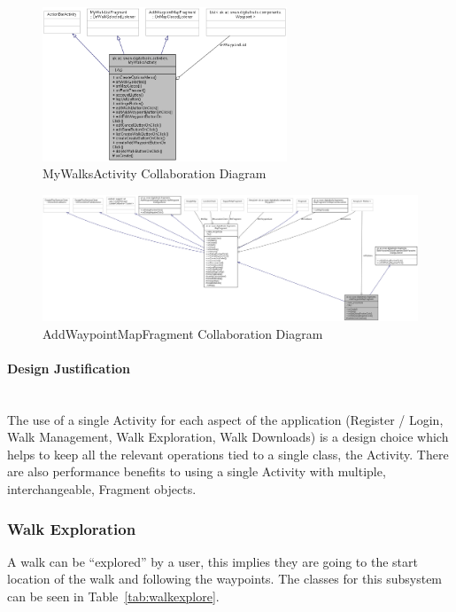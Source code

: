 \documentclass[11pt,a4paper]{report}
\begin{document}
\begin{figure}[H]
    \centering
    \includegraphics[width=0.65\textwidth]{mywalksactcollab}
    \caption{MyWalksActivity Collaboration Diagram}
    \label{fig:mywalksactcollab}
\end{figure}

\begin{figure}[H]
    \centering
    \includegraphics[width=.96\textheight, angle=90]{addwaypointcollab}
    \caption{AddWaypointMapFragment Collaboration Diagram}
    \label{fig:addwaypointcollab}
\end{figure}


\paragraph*{Design Justification}\mbox{}\\ 
The use of a single Activity for each aspect of the application (Register / Login, Walk Management, Walk Exploration, Walk Downloads) is a design choice which helps to keep all the relevant operations tied to a single class, the Activity. There are also performance benefits to using a single Activity with multiple, interchangeable, Fragment objects. 

\subsubsection{Walk Exploration}
\label{sec:walkexplore}
A walk can be ``explored'' by a user, this implies they are going to the start location of the walk and following the waypoints. The classes for this subsystem can be seen in Table~\ref{tab:walkexplore}.
\end{document}
